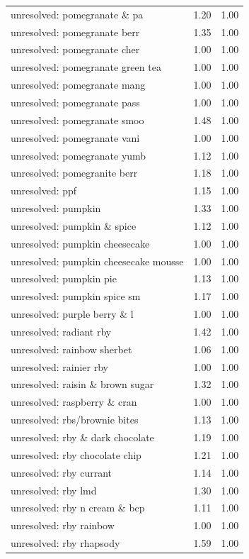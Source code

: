 \begin{table}
\begin{tabular}{lrr}
unresolved: pomegranate \& pa & 1.20 & 1.00 \\
unresolved: pomegranate berr & 1.35 & 1.00 \\
unresolved: pomegranate cher & 1.00 & 1.00 \\
unresolved: pomegranate green tea & 1.00 & 1.00 \\
unresolved: pomegranate mang & 1.00 & 1.00 \\
unresolved: pomegranate pass & 1.00 & 1.00 \\
unresolved: pomegranate smoo & 1.48 & 1.00 \\
unresolved: pomegranate vani & 1.00 & 1.00 \\
unresolved: pomegranate yumb & 1.12 & 1.00 \\
unresolved: pomegranite berr & 1.18 & 1.00 \\
unresolved: ppf & 1.15 & 1.00 \\
unresolved: pumpkin & 1.33 & 1.00 \\
unresolved: pumpkin \& spice & 1.12 & 1.00 \\
unresolved: pumpkin cheesecake & 1.00 & 1.00 \\
unresolved: pumpkin cheesecake mousse & 1.00 & 1.00 \\
unresolved: pumpkin pie & 1.13 & 1.00 \\
unresolved: pumpkin spice sm & 1.17 & 1.00 \\
unresolved: purple berry \& l & 1.00 & 1.00 \\
unresolved: radiant rby & 1.42 & 1.00 \\
unresolved: rainbow sherbet & 1.06 & 1.00 \\
unresolved: rainier rby & 1.00 & 1.00 \\
unresolved: raisin \& brown sugar & 1.32 & 1.00 \\
unresolved: raspberry \& cran & 1.00 & 1.00 \\
unresolved: rbs/brownie bites & 1.13 & 1.00 \\
unresolved: rby \& dark chocolate & 1.19 & 1.00 \\
unresolved: rby chocolate chip & 1.21 & 1.00 \\
unresolved: rby currant & 1.14 & 1.00 \\
unresolved: rby lmd & 1.30 & 1.00 \\
unresolved: rby n cream \& bcp & 1.11 & 1.00 \\
unresolved: rby rainbow & 1.00 & 1.00 \\
unresolved: rby rhapsody & 1.59 & 1.00 \\

\end{tabular}
\end{table}
